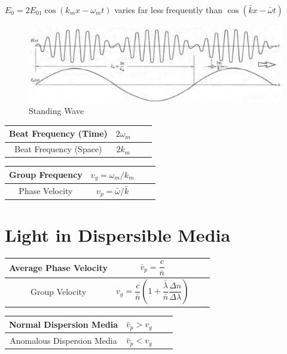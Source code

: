 $E_0 = 2 E_{01} \cos \left( k_m x - \omega_m t \right)$ varies far less frequently than $\cos \left( \bar{k} x - \bar{\omega} t \right)$

\begin{figure}[H]
  \centering
  \includegraphics[width=\linewidth]{figures/Standing-Wave}
  \caption{Standing Wave}
  \label{fig:}
\end{figure}

\begin{table}[h]
  \centering
  \begin{tabular}{|Sc|Sc|}
    \hline
    Beat Frequency (Time) & $2 \omega_m $ \\
    \hline
    Beat Frequency (Space) & $ 2 k_m $ \\
    \hline
  \end{tabular}
  \quad\quad\quad\quad
  \begin{tabular}{|Sc|Sc|}
    \hline
    Group Frequency & $v_g = \omega_m / k_m $ \\
    \hline
    Phase Velocity & $ v_p = \bar{\omega} / \bar{k}$ \\
    \hline
  \end{tabular}
\end{table}

\section{Light in Dispersible Media}

\begin{table}[h]
  \centering
  \begin{tabular}{|Sc|Sc|}
    \hline
    Average Phase Velocity & $\bar{v}_p = \dfrac{c}{\bar{n}} $ \\
    \hline
    Group Velocity & $v_g = \dfrac{c}{\bar{n}} \left( 1 + \dfrac{\bar{\lambda}}{\bar{n}} \dfrac{\Delta n}{\Delta \lambda}   \right) $ \\
    \hline
  \end{tabular}
  \quad\quad\quad\quad
  \begin{tabular}{|Sc|Sc|}
    \hline
    Normal Dispersion Media & $\bar{v}_p > v_g $ \\
    \hline
    Anomalous Dispersion Media & $ \bar{v}_p < v_g $ \\
    \hline
  \end{tabular}
\end{table}


